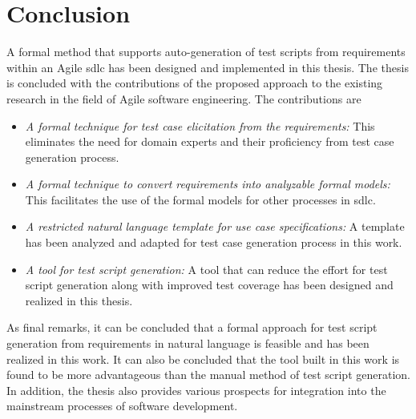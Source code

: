 \section{Conclusion}
A formal method that supports auto-generation of test scripts from requirements within an Agile \gls{sdlc} has been designed and implemented in this thesis. The thesis is concluded with the contributions of the proposed approach to the existing research in the field of Agile software engineering. The contributions are
\begin{itemize}
\item \textit{A formal technique for test case elicitation from the requirements:} This eliminates the need for domain experts and their proficiency from test case generation process. 
\item \textit{A formal technique to convert requirements into analyzable formal models:} This facilitates the use of the formal models for other processes in \gls{sdlc}.
\item \textit{A restricted natural language template for use case specifications:} A template has been analyzed and adapted for test case generation process in this work. 
\item \textit{A tool for test script generation:} A tool that can reduce the effort for test script generation along with improved test coverage has been designed and realized in this thesis.
\end{itemize}

As final remarks, it can be concluded that a formal approach for test script generation from requirements in natural language is feasible and has been realized in this work. It can also be concluded that the tool built in this work is found to be more advantageous than the manual method of test script generation. In addition, the thesis also provides various prospects for integration into the mainstream processes of software development.

